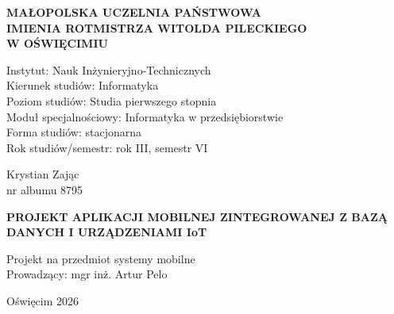 \thispagestyle{empty}

\begin{center}
    \vspace*{-1cm} %
    
    {\Large\textbf{\selectfont
        MAŁOPOLSKA UCZELNIA PAŃSTWOWA \\
        IMIENIA ROTMISTRZA WITOLDA PILECKIEGO \\
        W OŚWIĘCIMIU} \\[2.5em]} %
        \vspace{0.5cm}
            \begin{flushleft}
                {\normalsize
                \hspace*{3cm} Instytut: Nauk Inżynieryjno-Technicznych \\[1em]
                \hspace*{3cm} Kierunek studiów: Informatyka \\[1em]
                \hspace*{3cm} Poziom studiów: Studia pierwszego stopnia \\[1em]
                \hspace*{3cm} Moduł specjalnościowy: Informatyka w przedsiębiorstwie \\[1em]
                \hspace*{3cm} Forma studiów: stacjonarna \\[1em]
                \hspace*{3cm} Rok studiów/semestr: rok III, semestr VI}
            \end{flushleft}
        
        \vspace{1cm}
    
    {\normalsize
    Krystian Zając \\[1em]
    nr albumu 8795}
    
    \vspace{1cm}
    
    {\Large\textbf{\selectfont
    PROJEKT APLIKACJI MOBILNEJ ZINTEGROWANEJ Z BAZĄ DANYCH I URZĄDZENIAMI IoT}}
    
    \vspace{3cm}
    
    \begin{center}
    {\normalsize
    \hspace*{9cm}Projekt na przedmiot systemy mobilne \\[0.5em]
    \hspace*{9cm}Prowadzący: mgr inż. Artur Pelo \\[0.5em]}
    \end{center}
    
    \vfill
    \vspace{3cm}
   
    {\normalsize
    Oświęcim 2026}
    
\end{center}

\newpage